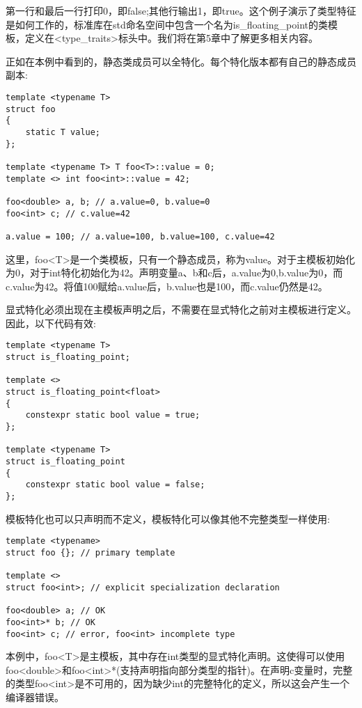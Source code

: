 第一行和最后一行打印0，即false;其他行输出1，即true。这个例子演示了类型特征是如何工作的，标准库在std命名空间中包含一个名为is\_floating\_point的类模板，定义在<type\_traits>标头中。我们将在第5章中了解更多相关内容。

正如在本例中看到的，静态类成员可以全特化。每个特化版本都有自己的静态成员副本:

\begin{lstlisting}[style=styleCXX]
template <typename T>
struct foo
{
	static T value;
};

template <typename T> T foo<T>::value = 0;
template <> int foo<int>::value = 42;

foo<double> a, b; // a.value=0, b.value=0
foo<int> c; // c.value=42

a.value = 100; // a.value=100, b.value=100, c.value=42
\end{lstlisting}

这里，foo<T>是一个类模板，只有一个静态成员，称为value。对于主模板初始化为0，对于int特化初始化为42。声明变量a、b和c后，a.value为0,b.value为0，而c.value为42。将值100赋给a.value后，b.value也是100，而c.value仍然是42。

显式特化必须出现在主模板声明之后，不需要在显式特化之前对主模板进行定义。因此，以下代码有效:

\begin{lstlisting}[style=styleCXX]
template <typename T>
struct is_floating_point;

template <>
struct is_floating_point<float>
{
	constexpr static bool value = true;
};

template <typename T>
struct is_floating_point
{
	constexpr static bool value = false;
};
\end{lstlisting}

模板特化也可以只声明而不定义，模板特化可以像其他不完整类型一样使用:

\begin{lstlisting}[style=styleCXX]
template <typename>
struct foo {}; // primary template

template <>
struct foo<int>; // explicit specialization declaration

foo<double> a; // OK
foo<int>* b; // OK
foo<int> c; // error, foo<int> incomplete type
\end{lstlisting}

本例中，foo<T>是主模板，其中存在int类型的显式特化声明。这使得可以使用foo<double>和foo<int>*(支持声明指向部分类型的指针)。在声明c变量时，完整的类型foo<int>是不可用的，因为缺少int的完整特化的定义，所以这会产生一个编译器错误。

